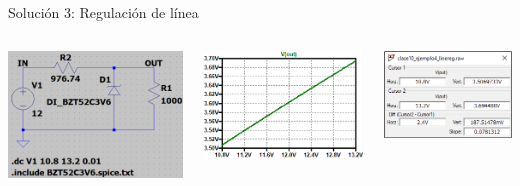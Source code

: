 \documentclass[t,aspectratio=169]{beamer}
\begin{document}
\begin{frame}{Solución 3: Regulación de línea}

\begin{columns}
\begin{column}{0.4\textwidth}
\includegraphics[width=\textwidth]{figures/linereg_schem.png}
\end{column}
\begin{column}{0.3\textwidth}
\includegraphics[width=\textwidth]{figures/linereg_plot.png}
\end{column}
\begin{column}{0.3\textwidth}
\includegraphics[width=\textwidth]{figures/linereg_measure.png}

\end{column}
\end{columns}
\end{frame}
\end{document}
